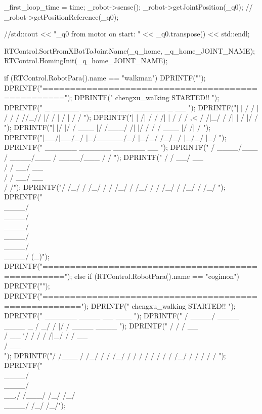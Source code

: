 {{	_first_loop_time = time;
	_robot->sense();
	_robot->getJointPosition(_q0);
	// _robot->getPositionReference(_q0);

	//std::cout << "_q0 from motor on start: " << _q0.transpose() << std::endl;

	RTControl.SortFromXBotToJointName(_q_home, _q_home_JOINT_NAME);
	RTControl.HomingInit(_q_home_JOINT_NAME);

	if (RTControl.RobotPara().name == "walkman") {
		DPRINTF("\n\n\n\n\n\n\n\n\n\n\n\n\n\n\n\n\n");
		DPRINTF("\n\n\n==================================================\n");
		DPRINTF("            chengxu_walking STARTED!!            \n\n");
		DPRINTF(" _       _____    __    __ __ __  ______    _   __ \n");
		DPRINTF("| |     / /   |  / /   / //_//  |/  /   |  / | / / \n");
		DPRINTF("| | /| / / /| | / /   / ,<  / /|_/ / /| | /  |/ /  \n");
		DPRINTF("| |/ |/ / ___ |/ /___/ /| |/ /  / / ___ |/ /|  /   \n");
		DPRINTF("|__/|__/_/  |_/_____/_/ |_/_/  /_/_/  |_/_/ |_/    \n");
		DPRINTF("   ______         ______         ______         __ \n");
		DPRINTF("  / ____/___     / ____/___     / ____/___     / / \n");
		DPRINTF(" / / __/ __ \\   / / __/ __ \\   / / __/ __ \\   / /\n");
		DPRINTF("/ /_/ / /_/ /  / /_/ / /_/ /  / /_/ / /_/ /  /_/    \n");
		DPRINTF("\\____/\\____/   \\____/\\____/   \\____/\\____/  (_)\n");
		DPRINTF("\n==================================================\n\n\n");
	}
	else if (RTControl.RobotPara().name == "cogimon") {
		DPRINTF("\n\n\n\n\n\n\n\n\n\n\n\n\n\n\n\n\n");
		DPRINTF("\n\n\n=====================================================\n");
		DPRINTF("               chengxu_walking STARTED!!               \n\n");
		DPRINTF("   ______                  ____  __  ___                 \n");
		DPRINTF("  / ____/ ____    ____ _  /  _/ /  |/  / ____    ____    \n");
		DPRINTF(" / /     / __ \\  / __ `/  / /  / /|_/ / / __ \\  / __ \\\n");
		DPRINTF("/ /___  / /_/ / / /_/ /  / /  / /  / / / /_/ / / / / /   \n");
		DPRINTF("\\____/  \\____/  \\__,/  /___/ /_/  /_/  \\____/ /_/ /_/\n");
}}}
